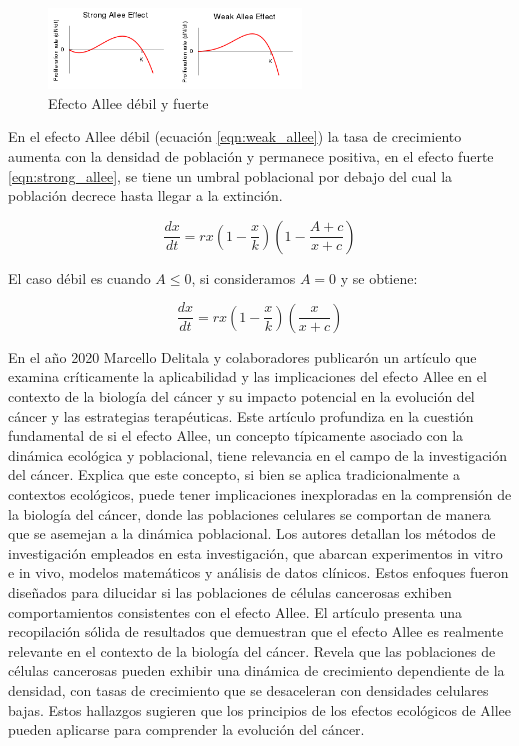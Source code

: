 \documentclass{article}
\begin{document}
\begin{figure}[ht]
    \centering
    \includegraphics[width=0.6\textwidth]{images/Allee.png}
    \caption{Efecto Allee débil y fuerte}
    \label{fig:allees}
\end{figure}

En el efecto Allee débil (ecuación \ref{eqn:weak_allee}) la tasa de crecimiento aumenta con la densidad de población y permanece positiva, en el efecto fuerte \ref{eqn:strong_allee}, se tiene un umbral poblacional por debajo del cual la población decrece hasta llegar a la extinción.

\begin{equation}
    \frac{d x}{ dt} = r x (1 - \frac{x}{k})(1- \frac{A+ c}{x + c})
    \label{eqn:strong_allee}
\end{equation}

El caso débil es cuando $A\leq 0$, si consideramos $A=0$ y se obtiene:

\begin{equation}
    \frac{d x}{ dt} = r x (1 - \frac{x}{k})(\frac{x}{x + c})
    \label{eqn:weak_allee}
\end{equation}

En el año 2020 Marcello Delitala y colaboradores\cite{Marcello2020} publicarón un artículo que examina críticamente la aplicabilidad y las implicaciones del efecto Allee en el contexto de la biología del cáncer y su impacto potencial en la evolución del cáncer y las estrategias terapéuticas. Este artículo profundiza en la cuestión fundamental de si el efecto Allee, un concepto típicamente asociado con la dinámica ecológica y poblacional, tiene relevancia en el campo de la investigación del cáncer. Explica que este concepto, si bien se aplica tradicionalmente a contextos ecológicos, puede tener implicaciones inexploradas en la comprensión de la biología del cáncer, donde las poblaciones celulares se comportan de manera que se asemejan a la dinámica poblacional. Los autores detallan los métodos de investigación empleados en esta investigación, que abarcan experimentos in vitro e in vivo, modelos matemáticos y análisis de datos clínicos. Estos enfoques fueron diseñados para dilucidar si las poblaciones de células cancerosas exhiben comportamientos consistentes con el efecto Allee. El artículo presenta una recopilación sólida de resultados que demuestran que el efecto Allee es realmente relevante en el contexto de la biología del cáncer. Revela que las poblaciones de células cancerosas pueden exhibir una dinámica de crecimiento dependiente de la densidad, con tasas de crecimiento que se desaceleran con densidades celulares bajas. Estos hallazgos sugieren que los principios de los efectos ecológicos de Allee pueden aplicarse para comprender la evolución del cáncer.
\end{document}
